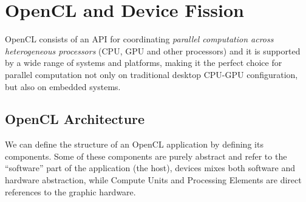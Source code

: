 \section{OpenCL and Device Fission}

OpenCL consists of an API for coordinating \textit{parallel computation across heterogeneous processors} (CPU, GPU and other processors) and it is supported by a wide range of systems and platforms, making it the perfect choice for parallel computation not only on traditional desktop CPU-GPU configuration, but also on embedded systems.


\subsection{OpenCL Architecture}

%
%
%
We can define the structure of an OpenCL application by defining its components. Some of these components are purely abstract and refer to the "`software"' part of the application (the host), devices mixes both software and hardware abstraction, while Compute Units and Processing Elements are direct references to the graphic hardware.

